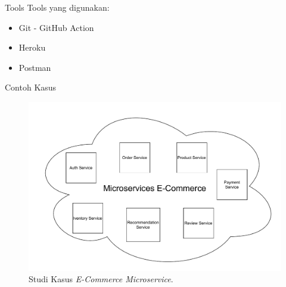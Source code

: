 \documentclass{beamer}
\begin{document}
	\begin{frame}{Tools}
		Tools yang digunakan:
		\begin{itemize}
			\item Git - GitHub Action
			\item Heroku
			\item Postman
		\end{itemize}
	\end{frame}

	\begin{frame}{Contoh Kasus}
		\begin{figure}[h]
			\centering
			\includegraphics[width=\textwidth]{Chapter-14-Studi-Kasus}
			\caption{Studi Kasus \textit{E-Commerce Microservice}.}
			\label{fig:client-server-schema}
		\end{figure}
	
	\end{frame}
\end{document}
